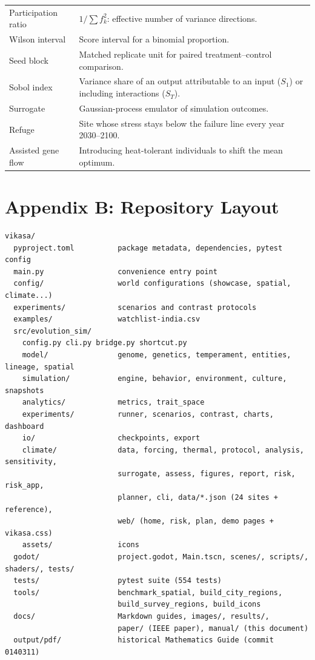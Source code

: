 \begin{longtable}{p{3.8cm}p{11.2cm}}
Participation ratio & $1/\sum f_k^2$: effective number of variance directions. \\
Wilson interval & Score interval for a binomial proportion. \\
Seed block & Matched replicate unit for paired treatment--control comparison. \\
Sobol index & Variance share of an output attributable to an input ($S_1$) or including interactions ($S_T$). \\
Surrogate & Gaussian-process emulator of simulation outcomes. \\
Refuge & Site whose stress stays below the failure line every year 2030--2100. \\
Assisted gene flow & Introducing heat-tolerant individuals to shift the mean optimum. \\
\bottomrule
\end{longtable}

\chapter*{Appendix B: Repository Layout}
\begin{lstlisting}
vikasa/
  pyproject.toml          package metadata, dependencies, pytest config
  main.py                 convenience entry point
  config/                 world configurations (showcase, spatial, climate...)
  experiments/            scenarios and contrast protocols
  examples/               watchlist-india.csv
  src/evolution_sim/
    config.py cli.py bridge.py shortcut.py
    model/                genome, genetics, temperament, entities, lineage, spatial
    simulation/           engine, behavior, environment, culture, snapshots
    analytics/            metrics, trait_space
    experiments/          runner, scenarios, contrast, charts, dashboard
    io/                   checkpoints, export
    climate/              data, forcing, thermal, protocol, analysis, sensitivity,
                          surrogate, assess, figures, report, risk, risk_app,
                          planner, cli, data/*.json (24 sites + reference),
                          web/ (home, risk, plan, demo pages + vikasa.css)
    assets/               icons
  godot/                  project.godot, Main.tscn, scenes/, scripts/, shaders/, tests/
  tests/                  pytest suite (554 tests)
  tools/                  benchmark_spatial, build_city_regions,
                          build_survey_regions, build_icons
  docs/                   Markdown guides, images/, results/,
                          paper/ (IEEE paper), manual/ (this document)
  output/pdf/             historical Mathematics Guide (commit 0140311)
\end{lstlisting}

